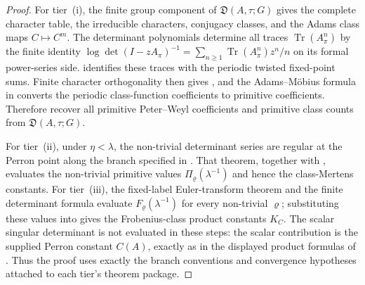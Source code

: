 \documentclass[11pt,a4paper]{amsart}
\theoremstyle{plain}
\theoremstyle{definition}
\theoremstyle{remark}
\DeclareMathOperator{\Tr}{Tr}
\begin{document}
\begin{proof}
  For tier~\textup{(i)}, the finite group component of
  \(\mathfrak D(A,\tau;G)\) gives the complete
  character table, the irreducible characters, conjugacy classes, and the Adams
  class maps \(C\mapsto C^m\).  The determinant polynomials determine all
  traces \(\Tr(A_\pi^n)\) by the finite identity
  \(\log\det(I-zA_\pi)^{-1}=\sum_{n\ge1}\Tr(A_\pi^n)z^n/n\) on its formal
  power-series side.   identifies these traces
  with the periodic twisted fixed-point sums.  Finite character orthogonality
  then gives , and the Adams--M\"obius
  formula in  converts the periodic
  class-function coefficients to primitive coefficients.  Therefore
   recover all primitive Peter--Weyl
  coefficients and primitive class counts from \(\mathfrak D(A,\tau;G)\).

  For tier~\textup{(ii)}, under \(\eta<\lambda\), the non-trivial determinant series are regular at the
  Perron point along the branch specified in
  .  That theorem, together with
  , evaluates
  the non-trivial primitive values \(\Pi_\varrho(\lambda^{-1})\) and hence the
  class-Mertens constants.  For tier~\textup{(iii)}, the fixed-label
  Euler-transform theorem  and the finite determinant formula
   evaluate
  \(F_\varrho(\lambda^{-1})\) for every non-trivial \(\varrho\); substituting
  these values into  gives the
  Frobenius-class product constants \(K_C\).  The scalar singular determinant
  is not evaluated in these steps: the scalar contribution is the supplied
  Perron constant \(C(A)\), exactly as in the displayed product formulas of
  .
  Thus the proof uses exactly the branch conventions and convergence
  hypotheses attached to each tier's theorem package.


\end{proof}
\end{document}
